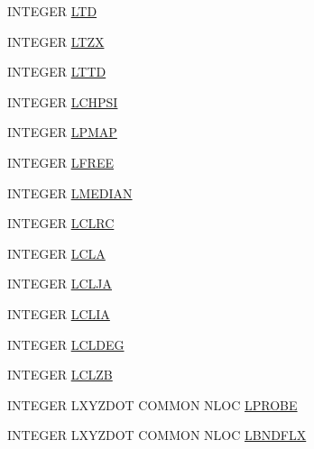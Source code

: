 \begin{DoxyCompactItemize}
\item 
I\-N\-T\-E\-G\-E\-R \hyperlink{msa20_2home_2abonfi_2_c_f_d__codes_2_eul_f_s_83_82_83_2include_2nloc_8com_a0b1f5dbbdc62804ec5dc66af1e132a37}{L\-T\-D}
\item 
I\-N\-T\-E\-G\-E\-R \hyperlink{msa20_2home_2abonfi_2_c_f_d__codes_2_eul_f_s_83_82_83_2include_2nloc_8com_a537c58a1ee889969543d80d603f7a358}{L\-T\-Z\-X}
\item 
I\-N\-T\-E\-G\-E\-R \hyperlink{msa20_2home_2abonfi_2_c_f_d__codes_2_eul_f_s_83_82_83_2include_2nloc_8com_a8cf955e8c6aacac0c0ed4dba5b348b02}{L\-T\-T\-D}
\item 
I\-N\-T\-E\-G\-E\-R \hyperlink{msa20_2home_2abonfi_2_c_f_d__codes_2_eul_f_s_83_82_83_2include_2nloc_8com_a8764a03c9a3d37242bf263951a9b72fe}{L\-C\-H\-P\-S\-I}
\item 
I\-N\-T\-E\-G\-E\-R \hyperlink{msa20_2home_2abonfi_2_c_f_d__codes_2_eul_f_s_83_82_83_2include_2nloc_8com_aad3707d655f61ee00f44d0ffafa8ad6a}{L\-P\-M\-A\-P}
\item 
I\-N\-T\-E\-G\-E\-R \hyperlink{msa20_2home_2abonfi_2_c_f_d__codes_2_eul_f_s_83_82_83_2include_2nloc_8com_ad8866cf17212aeb1747c0d878ce02b6a}{L\-F\-R\-E\-E}
\item 
I\-N\-T\-E\-G\-E\-R \hyperlink{msa20_2home_2abonfi_2_c_f_d__codes_2_eul_f_s_83_82_83_2include_2nloc_8com_a8d798cd68d415a92ae547f41860a401f}{L\-M\-E\-D\-I\-A\-N}
\item 
I\-N\-T\-E\-G\-E\-R \hyperlink{msa20_2home_2abonfi_2_c_f_d__codes_2_eul_f_s_83_82_83_2include_2nloc_8com_a50c67f35190ba28d966fa34213f34d31}{L\-C\-L\-R\-C}
\item 
I\-N\-T\-E\-G\-E\-R \hyperlink{msa20_2home_2abonfi_2_c_f_d__codes_2_eul_f_s_83_82_83_2include_2nloc_8com_a6a7facc1bafbe15e7a64356336cbf970}{L\-C\-L\-A}
\item 
I\-N\-T\-E\-G\-E\-R \hyperlink{msa20_2home_2abonfi_2_c_f_d__codes_2_eul_f_s_83_82_83_2include_2nloc_8com_af7aee801d75be31ba1a749e75b742b1f}{L\-C\-L\-J\-A}
\item 
I\-N\-T\-E\-G\-E\-R \hyperlink{msa20_2home_2abonfi_2_c_f_d__codes_2_eul_f_s_83_82_83_2include_2nloc_8com_a94e3dae076b855d560e7a19444d9cdb9}{L\-C\-L\-I\-A}
\item 
I\-N\-T\-E\-G\-E\-R \hyperlink{msa20_2home_2abonfi_2_c_f_d__codes_2_eul_f_s_83_82_83_2include_2nloc_8com_a63ce6a58e71c59904b91171f31e311f4}{L\-C\-L\-D\-E\-G}
\item 
I\-N\-T\-E\-G\-E\-R \hyperlink{msa20_2home_2abonfi_2_c_f_d__codes_2_eul_f_s_83_82_83_2include_2nloc_8com_a28bfbe31dd157ea6cf996d8dc53c016b}{L\-C\-L\-Z\-B}
\item 
I\-N\-T\-E\-G\-E\-R L\-X\-Y\-Z\-D\-O\-T C\-O\-M\-M\-O\-N N\-L\-O\-C \hyperlink{msa20_2home_2abonfi_2_c_f_d__codes_2_eul_f_s_83_82_83_2include_2nloc_8com_a8e6118a4515655b3f08c2f37aa4eacda}{L\-P\-R\-O\-B\-E}
\item 
I\-N\-T\-E\-G\-E\-R L\-X\-Y\-Z\-D\-O\-T C\-O\-M\-M\-O\-N N\-L\-O\-C \hyperlink{msa20_2home_2abonfi_2_c_f_d__codes_2_eul_f_s_83_82_83_2include_2nloc_8com_a91109db3fe2ba82c0a5d1f145597641b}{L\-B\-N\-D\-F\-L\-X}
\end{DoxyCompactItemize}


